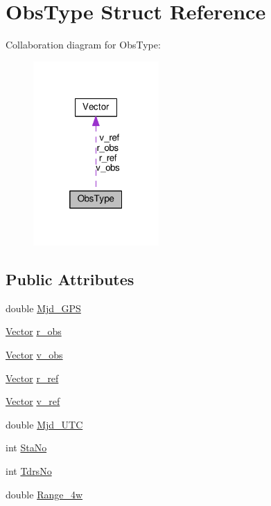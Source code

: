 \hypertarget{structObsType}{\section{Obs\-Type Struct Reference}
\label{structObsType}
}


Collaboration diagram for Obs\-Type\-:\nopagebreak
\begin{figure}[H]
\begin{center}
\leavevmode
\includegraphics[width=136pt]{structObsType__coll__graph}
\end{center}
\end{figure}
\subsection*{Public Attributes}
\begin{DoxyCompactItemize}
\item 
double \hyperlink{structObsType_aa3760b979aaa5eb0713c7ddb4ee03db0}{Mjd\-\_\-\-G\-P\-S}
\item 
\hyperlink{classVector}{Vector} \hyperlink{structObsType_ac05e08b6d7a68ade56df2f2833acce47}{r\-\_\-obs}
\item 
\hyperlink{classVector}{Vector} \hyperlink{structObsType_a78a3431694e3fb1f6aa93a4be3546252}{v\-\_\-obs}
\item 
\hyperlink{classVector}{Vector} \hyperlink{structObsType_af966bcceef7dcbece45eec2265a86e12}{r\-\_\-ref}
\item 
\hyperlink{classVector}{Vector} \hyperlink{structObsType_a82704392ace0e555604f2cee287fa456}{v\-\_\-ref}
\item 
double \hyperlink{structObsType_a5fea5ee9941f15d8aead3b4b44c7c096}{Mjd\-\_\-\-U\-T\-C}
\item 
int \hyperlink{structObsType_aa862468ded2618b8184946616cc55b74}{Sta\-No}
\item 
int \hyperlink{structObsType_aa2e173387732fca7bc9987a042a2c099}{Tdrs\-No}
\item 
double \hyperlink{structObsType_ac6117b66417dd51195f5319b00667df8}{Range\-\_\-4w}
\end{DoxyCompactItemize}


